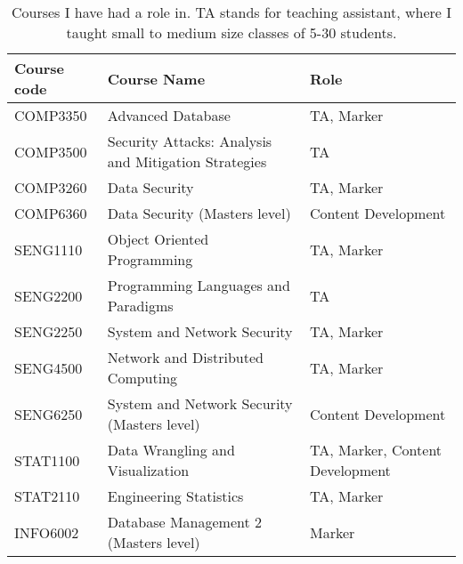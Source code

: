 \documentclass{myresume}
\begin{document}
        \begin{table}[H]
            \caption{Courses I have had a role in. TA stands for teaching assistant, where I taught small to medium size classes of 5-30 students.}
            \begin{center}
            \begin{tabular}{ l | l | l }
                    \hline
                    \textbf{Course code} & \textbf{Course Name} & \textbf{Role} \\
                    \hline
                    \hline
                    COMP3350 & Advanced Database & TA, Marker \\
                    \hline
                    COMP3500 & Security Attacks: Analysis and Mitigation Strategies & TA \\
                    \hline
                    COMP3260 & Data Security & TA, Marker \\
                    \hline
                    COMP6360 & Data Security (Masters level) & Content Development \\
                    \hline
                    SENG1110 & Object Oriented Programming & TA, Marker \\
                    \hline
                    SENG2200 & Programming Languages and Paradigms & TA \\
                    \hline
                    SENG2250 & System and Network Security & TA, Marker \\
                    \hline
                    SENG4500 & Network and Distributed Computing & TA, Marker \\
                    \hline
                    SENG6250 & System and Network Security (Masters level) & Content Development \\
                    \hline
                    STAT1100 & Data Wrangling and Visualization & TA, Marker, Content Development \\
                    \hline
                    STAT2110 & Engineering Statistics & TA, Marker \\
                    \hline
                    INFO6002 & Database Management 2 (Masters level) & Marker \\
                    \hline
            \end{tabular}
            \end{center}
        \end{table}



    	
	\nocite{*}
	
\end{document}
